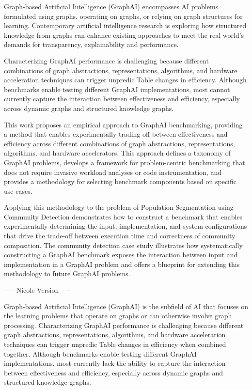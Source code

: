 Graph-based Artificial Intelligence (GraphAI) encompasses AI problems formulated using graphs, operating on graphs, or relying on graph structures for learning. Contemporary artificial intelligence research is exploring how structured knowledge from graphs can enhance existing approaches to meet the real world's demands for transparency, explainability and performance.

Characterizing GraphAI performance is challenging because different combinations of graph abstractions, representations, algorithms, and hardware acceleration techniques can trigger unpredic Table changes in efficiency. Although benchmarks enable testing different GraphAI implementations, most cannot currently capture the interaction between effectiveness and efficiency, especially across dynamic graphs and structured knowledge graphs.

This work proposes an empirical approach to GraphAI benchmarking, providing a method that enables experimentally trading off between effectiveness and efficiency across different combinations of graph abstractions, representations, algorithms, and hardware accelerators. This approach defines a taxonomy of GraphAI problems, develops a framework for problem-centric benchmarking that does not require invasive workload analyses or code instrumentation, and provides a methodology for selecting benchmark components based on specific use cases. 

Applying this methodology to the problem of Population Segmentation using Community Detection demonstrates how to construct a benchmark that enables experimentally determining the input, implementation, and system configurations that drive the trade-off between execution time and correctness of community composition. The community detection case study illustrates how systematically constructing a GraphAI benchmark exposes the interaction between input and implementation in a GraphAI problem and offers a blueprint for extending this methodology to future GraphAI problems.



----- Nicole Version ----

Graph-based Artificial Intelligence (GraphAI) is the subfield of AI that focuses on the learning problems that operate on graphs or can otherwise involve graph processing. Characterizing GraphAI performance is challenging because different graph abstractions, representations, algorithms, and hardware acceleration techniques can trigger unpredic Table changes in efficiency when combined together. Although benchmarks enable testing different GraphAI implementations, most currently lack the ability to capture the interaction between effectiveness and efficiency, especially across dynamic graphs and structured knowledge graphs.


